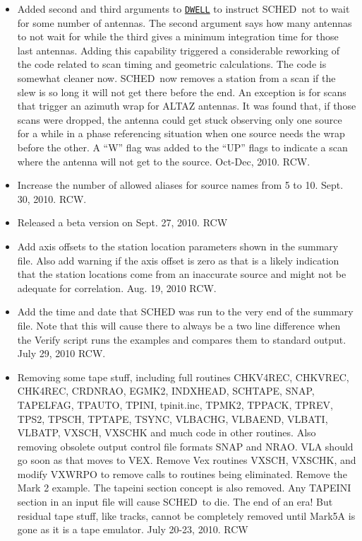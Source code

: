 \documentclass{report}
\newcommand{\schedb}{{\sc SCHED~}}
\begin{document}
\begin{itemize}
\item Added second and third arguments to 
{\hyperref[MP:DWELL]{{\tt DWELL}}}
to instruct \schedb not to wait for some number of
antennas.  The second argument says how many antennas to not wait for
while the third gives a minimum integration time for those last antennas.
Adding this capability triggered a considerable reworking of the code
related to scan timing and geometric calculations.  The code is somewhat
cleaner now.  \schedb now removes a station from a scan if the slew is
so long it will not get there before the end.  An exception is for
scans that trigger an azimuth wrap for ALTAZ antennas.  It was found
that, if those scans were dropped, the antenna could get stuck observing
only one source for a while in a phase referencing situation when one
source needs the wrap before the other.  A ``W'' flag was added to the
``UP'' flags to indicate a scan where the antenna will not get to the
source.  Oct-Dec, 2010.  RCW.

\item Increase the number of allowed aliases for source names from
5 to 10.  Sept. 30, 2010.  RCW.

\item Released a beta version on Sept. 27, 2010.  RCW

\item Add axis offsets to the station location parameters shown
in the summary file.  Also add warning if the axis offset is zero
as that is a likely indication that the station locations come
from an inaccurate source and might not be adequate for correlation.
Aug. 19, 2010  RCW.

\item Add the time and date that SCHED was run to the very end of
the summary file.  Note that this will cause there to always
be a two line difference when the Verify script runs the examples
and compares them to standard output.  July 29, 2010  RCW.

\item Removing some tape stuff, including full routines CHKV4REC,
CHKVREC, CHK4REC, CRDNRAO, EGMK2, INDXHEAD, SCHTAPE, SNAP, TAPELFAG,
TPAUTO, TPINI, tpinit.inc, TPMK2, TPPACK, TPREV, TPS2, TPSCH, TPTAPE,
TSYNC, VLBACHG, VLBAEND, VLBATI, VLBATP, VXSCH, VXSCHK and much code
in other routines.  Also removing obsolete output control file formats
SNAP and NRAO.  VLA should go soon as that moves to VEX.  Remove Vex
routines VXSCH, VXSCHK, and modify VXWRPO to remove calls to routines
being eliminated.  Remove the Mark 2 example.  The tapeini section
concept is also removed.  Any TAPEINI section in an input file will
cause \schedb to die.  The end of an era!  But residual tape stuff,
like tracks, cannot be completely removed until Mark5A is gone as
it is a tape emulator.  July 20-23, 2010.  RCW


\end{itemize}
\end{document}

